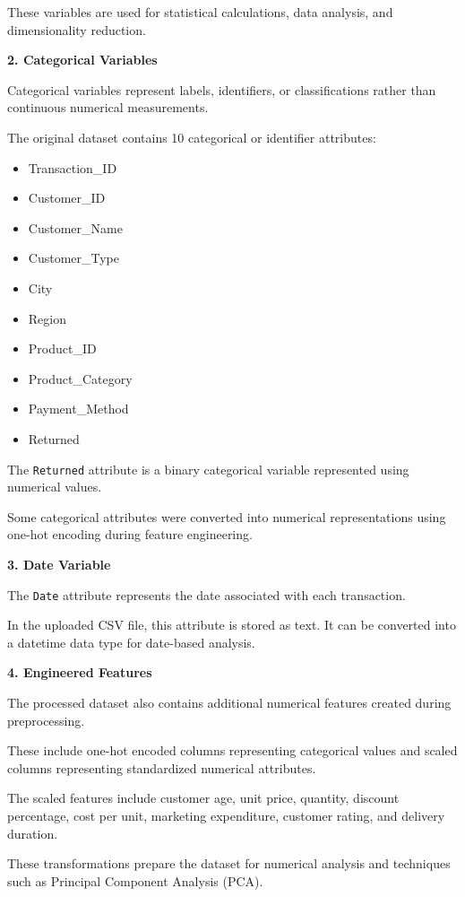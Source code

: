 \documentclass[12pt,a4paper]{report}
\begin{document}
These variables are used for statistical
calculations, data analysis, and
dimensionality reduction.

\textbf{2. Categorical Variables}

Categorical variables represent labels,
identifiers, or classifications rather
than continuous numerical measurements.

The original dataset contains
10 categorical or identifier attributes:

\begin{itemize}
    \item Transaction\_ID
    \item Customer\_ID
    \item Customer\_Name
    \item Customer\_Type
    \item City
    \item Region
    \item Product\_ID
    \item Product\_Category
    \item Payment\_Method
    \item Returned
\end{itemize}

The \texttt{Returned} attribute is a
binary categorical variable represented
using numerical values.

Some categorical attributes were converted
into numerical representations using
one-hot encoding during feature engineering.

\textbf{3. Date Variable}

The \texttt{Date} attribute represents
the date associated with each transaction.

In the uploaded CSV file, this attribute
is stored as text. It can be converted
into a datetime data type for
date-based analysis.

\textbf{4. Engineered Features}

The processed dataset also contains
additional numerical features created
during preprocessing.

These include one-hot encoded columns
representing categorical values and
scaled columns representing standardized
numerical attributes.

The scaled features include customer age,
unit price, quantity, discount percentage,
cost per unit, marketing expenditure,
customer rating, and delivery duration.

These transformations prepare the dataset
for numerical analysis and techniques
such as Principal Component Analysis (PCA).
\end{document}
